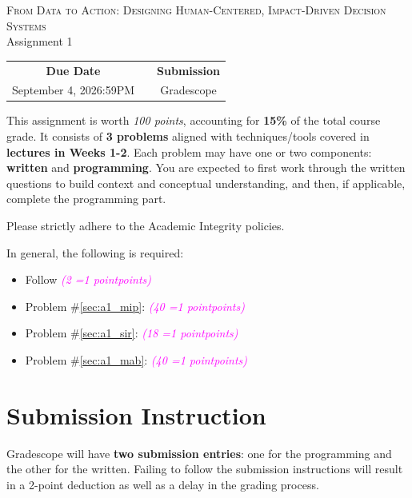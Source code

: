\documentclass[11pt, letter, answers]{exam}
\newcommand{\grade}[1]{
    \small\textcolor{magenta}{\emph{(#1 \ifnum#1=1 point\else points\fi)}}%
    \normalsize
}
\begin{document}
\begin{center}
{\Large \textsc{From Data to Action: Designing Human-Centered, Impact-Driven Decision Systems}} \\
[0.5em]
{\Large Assignment 1}
\end{center}

\begin{center}
\begin{tabular}{ccc}
\hline
\textbf{Due Date} & & \textbf{Submission} \\
September 4, 2026\quad 11:59PM & & Gradescope \\
\hline
\end{tabular}
\end{center}

\vspace{1em}
This assignment is worth \textit{\color{magenta}\textit{100 points}}, accounting for \textbf{15\%} of the total course grade. It consists of \textbf{3 problems} aligned with techniques/tools covered in \textbf{lectures in Weeks 1-2}. Each problem may have one or two components: \textbf{written} and \textbf{programming}. You are expected to first work through the written questions to build context and conceptual understanding, and then, if applicable, complete the programming part. 

Please strictly adhere to the Academic Integrity policies.%

In general, the following is required:
\begin{itemize}
    \item Follow  \grade{2}
    \item Problem \#\ref{sec:a1_mip}:  \grade{40}
    \item Problem \#\ref{sec:a1_sir}:  \grade{18}
    \item Problem \#\ref{sec:a1_mab}:  \grade{40}
\end{itemize}


\section*{Submission Instruction}
\label{sec:a1_submission}

Gradescope will have \textbf{two submission entries}: one for the programming and the other for the written. Failing to follow the submission instructions will result in a 2-point deduction as well as a delay in the grading process.
\end{document}
